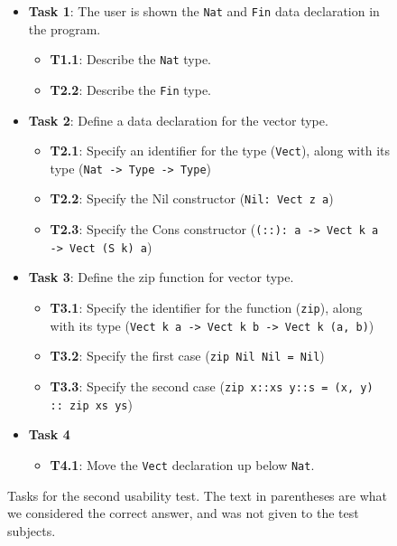 \begin{figure}
\centering
\begin{itemize}
	\item \textbf{Task 1}: The user is shown the \texttt{Nat} and \texttt{Fin} data declaration in the program.
	\begin{itemize}
		\item \textbf{T1.1}: Describe the \texttt{Nat} type.
		\item \textbf{T2.2}: Describe the \texttt{Fin} type.
	\end{itemize}
	\item \textbf{Task 2}: Define a data declaration for the vector type.
	\begin{itemize}
		\item \textbf{T2.1}: Specify an identifier for the type (\texttt{Vect}), along with its type (\texttt{Nat -> Type -> Type})
		\item \textbf{T2.2}: Specify the Nil constructor (\texttt{Nil: Vect z a})
		\item \textbf{T2.3}: Specify the Cons constructor (\texttt{(::): a -> Vect k a -> Vect (S k) a})
	\end{itemize}
	\item \textbf{Task 3}: Define the zip function for vector type.
	\begin{itemize}
		\item \textbf{T3.1}: Specify the identifier for the function (\texttt{zip}), along with its type (\texttt{Vect k a -> Vect k b -> Vect k (a, b)})
		\item \textbf{T3.2}: Specify the first case (\texttt{zip Nil Nil = Nil})
		\item \textbf{T3.3}: Specify the second case (\texttt{zip x::xs y::s = (x, y) :: zip xs ys})
	\end{itemize}
	\item \textbf{Task 4}
	\begin{itemize}
		\item \textbf{T4.1}: Move the \texttt{Vect} declaration up below \texttt{Nat}.
	\end{itemize}
\end{itemize}
\caption{Tasks for the second usability test. The text in parentheses are what we considered the correct answer, and was not given to the test subjects.}
\label{figure:second_tasks}
\end{figure}

